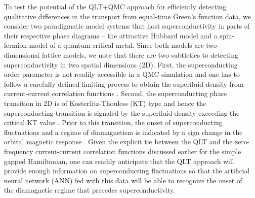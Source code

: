 \documentclass[amsmath,amssymb, aps, prx, longbibliography, twocolumn]{revtex4-1}
\begin{document}


%
To test the potential of the QLT+QMC approach for efficiently detecting qualitative differences in the transport from equal-time Green's function data, we consider two paradigmatic model systems that host superconductivity in parts of their respective phase diagrams -- the attractive Hubbard model and a spin-fermion model of a quantum critical metal.
Since both models are two-dimensional lattice models, we note that there are two subtleties to detecting superconductivity  in two spatial dimensions (2D). First, the superconducting order parameter is not readily accessible in a QMC simulation and one has to follow a carefully defined limiting process to obtain the superfluid density from current-current correlation functions \cite{Scalapino1993, Scalapino1992}. Second, the superconducting phase transition in 2D is of Kosterlitz-Thouless (KT) type and hence the superconducting transition is signaled by the superfluid density exceeding the  critical KT value \cite{KT1973}. Prior to this transition, the onset of superconducting fluctuations and a regime of diamagnetism is indicated by a sign change in the orbital magnetic response \cite{Schattner2016}. Given the explicit tie between the QLT and the zero-frequency current-current correlation functions discussed earlier for the simple gapped Hamiltonian, one can readily anticipate that the QLT approach will provide enough information on superconducting fluctuations so that the artificial neural network (ANN) fed with this data will be able to recognize the onset of the diamagnetic regime that precedes  superconductivity.  
\end{document}
